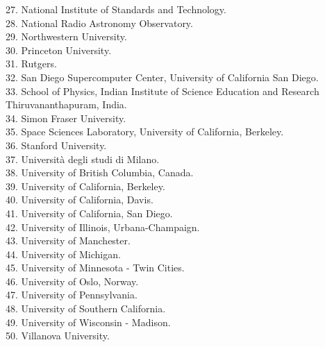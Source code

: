 \documentclass[PICOReport.tex]{subfiles}
\begin{document}
\begin{multicols}{2}
{27. National Institute of Standards and Technology.  \\
28. National Radio Astronomy Observatory.  \\
29. Northwestern University.  \\
30. Princeton University.  \\
31. Rutgers.  \\
32. San Diego Supercomputer Center, University of California San Diego.  \\
33. School of Physics, Indian Institute of Science Education and Research Thiruvananthapuram,  India.  \\
34. Simon Fraser University.  \\
35. Space Sciences Laboratory, University of California, Berkeley.  \\
36. Stanford University.  \\
37. Universit\`a degli studi di Milano.  \\
38. University of British Columbia, Canada.  \\
39. University of California, Berkeley.  \\
40. University of California, Davis.  \\
41. University of California, San Diego.  \\
42. University of Illinois, Urbana-Champaign.  \\
43. University of Manchester.  \\
44. University of Michigan.  \\
45. University of Minnesota - Twin Cities.  \\
46. University of Oslo, Norway.  \\
47. University of Pennsylvania.  \\
48. University of Southern California.  \\
49. University of Wisconsin - Madison.  \\
50. Villanova University.  
}
\end{multicols}
\end{document}

